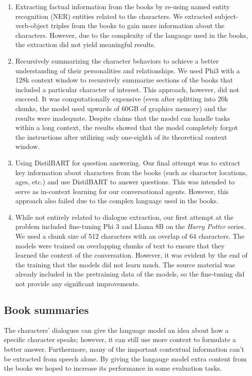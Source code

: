 \documentclass[fleqn,moreauthors,10pt]{ds_report}
\begin{document}
\begin{enumerate}
	\item Extracting factual information from the books by re-using named entity recognition (NER) entities related to the characters. We extracted subject-verb-object triples from the books to gain more information about the characters. However, due to the complexity of the language used in the books, the extraction did not yield meaningful results.

	\item Recursively summarizing the character behaviors to achieve a better understanding of their personalities and relationships. We used Phi3 with a 128k context window to recursively summarize sections of the books that included a particular character of interest. This approach, however, did not succeed. It was computationally expensive (even after splitting into 20k chunks, the model used upwards of 60GB of graphics memory) and the results were inadequate. Despite claims that the model can handle tasks within a long context, the results showed that the model completely forgot the instructions after utilizing only one-eighth of its theoretical context window.

	\item Using DistilBART for question answering. Our final attempt was to extract key information about characters from the books (such as character locations, ages, etc.) and use DistilBART to answer questions. This was intended to serve as in-context learning for our conversational agents. However, this approach also failed due to the complex language used in the books.

	\item While not entirely related to dialogue extraction, our first attempt at the problem included fine-tuning Phi 3 and Llama 8B on the \textit{Harry Potter} series. We used a chunk size of 512 characters with an overlap of 64 characters. The models were trained on overlapping chunks of text to ensure that they learned the context of the conversation. However, it was evident by the end of the training that the models did not learn much. The source material was already included in the pretraining data of the models, so the fine-tuning did not provide any significant improvements.

\end{enumerate}

\subsection*{Book summaries}
The characters' dialogues can give the language model an idea about how a specific character speaks; however, it can still use more context to formulate a better answer.
Furthermore, many of the important contextual information can't be extracted from speech alone.
By giving the langauge model extra content from the books we hoped to increase its performance in some evaluation tasks.
\end{document}
